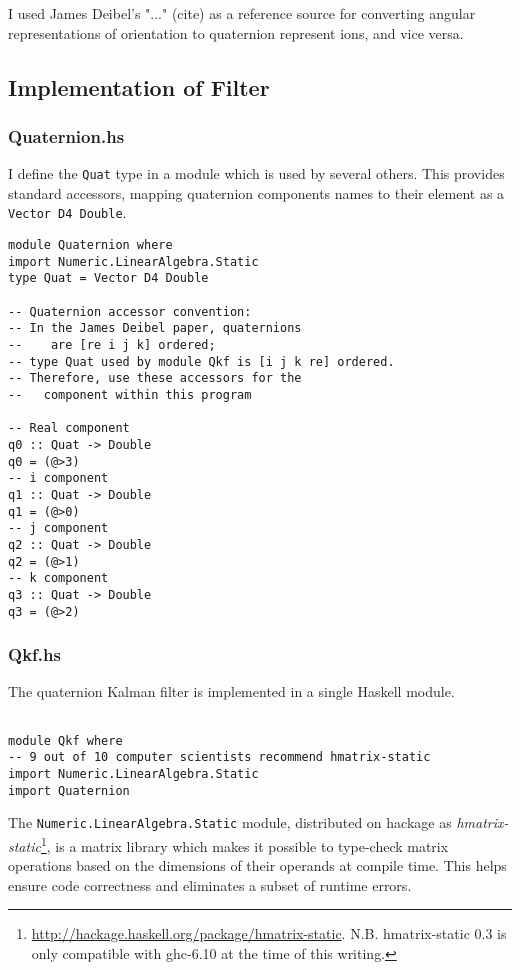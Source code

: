 \documentclass[12pt]{report}
\begin{document}
I used James Deibel's "..." (cite) as a reference source for converting angular representations of orientation to quaternion represent ions, and vice versa. 

\subsection{Implementation of Filter}

\subsubsection{Quaternion.hs}
I define the \lstinline$Quat$ type in a module which is used by several others. This provides standard accessors, mapping quaternion components names to their element as a \lstinline$Vector D4 Double$.
\begin{lstlisting}
module Quaternion where
import Numeric.LinearAlgebra.Static
type Quat = Vector D4 Double

-- Quaternion accessor convention:
-- In the James Deibel paper, quaternions 
--    are [re i j k] ordered; 
-- type Quat used by module Qkf is [i j k re] ordered.
-- Therefore, use these accessors for the 
--   component within this program

-- Real component
q0 :: Quat -> Double
q0 = (@>3) 
-- i component
q1 :: Quat -> Double
q1 = (@>0)
-- j component
q2 :: Quat -> Double
q2 = (@>1) 
-- k component
q3 :: Quat -> Double
q3 = (@>2) 
\end{lstlisting}

\subsubsection{Qkf.hs}
The quaternion Kalman filter is implemented in a single Haskell module.
\begin{lstlisting}

module Qkf where
-- 9 out of 10 computer scientists recommend hmatrix-static
import Numeric.LinearAlgebra.Static
import Quaternion
\end{lstlisting}


The \lstinline$Numeric.LinearAlgebra.Static$ module, distributed on hackage as \emph{hmatrix-static}\footnote{\url{http://hackage.haskell.org/package/hmatrix-static}. N.B. hmatrix-static 0.3 is only compatible with ghc-6.10 at the time of this writing.}, 
is a matrix library which makes it possible to type-check matrix operations based on the dimensions of their operands at compile time. This helps ensure code correctness and eliminates a subset of runtime errors.
\end{document}
